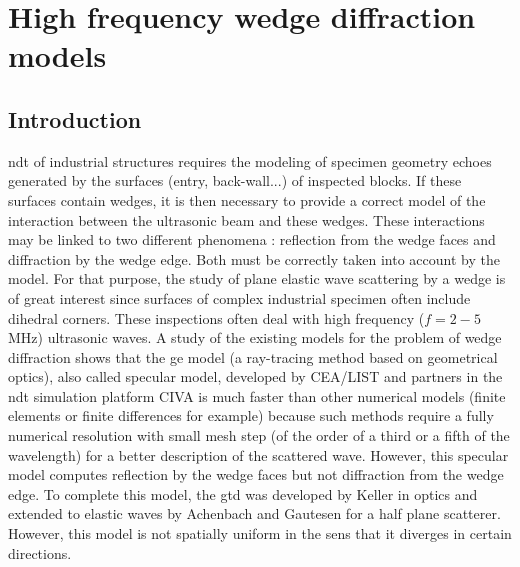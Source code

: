 \chapter[][State of the Art]{High frequency wedge diffraction models}
\label{chap-biblio}

\section*{Introduction}
\acrfull{ndt} of industrial structures requires the modeling of specimen geometry echoes generated by the surfaces (entry, back-wall...) of inspected blocks. If these surfaces contain wedges, it is then necessary to provide a correct model of the interaction between the ultrasonic beam and these wedges. These interactions may be linked to two different phenomena : reflection from the wedge faces and diffraction by the wedge edge. Both must be correctly taken into account by the model. For that purpose, the study of plane elastic wave scattering by a wedge is of great interest since surfaces of complex industrial specimen often include dihedral corners.
These inspections often deal with high frequency ($f=2-5$ MHz) ultrasonic waves. A study of the existing models for the problem of wedge diffraction shows that the \acrfull{ge} model (a ray-tracing method based on geometrical optics), also called specular model, developed by CEA/LIST and partners in the \acrshort{ndt} simulation platform CIVA \cite{Darmonspec} is much faster than other numerical models (finite elements or finite differences for example) because such methods require a fully numerical resolution with small mesh step (of the order of a third or a fifth of the wavelength) for a better description of the scattered wave. However, this specular model computes reflection by the wedge faces but not diffraction from the wedge edge. To complete this model, the \acrfull{gtd} was developed by Keller \cite{GTD} in optics and extended to elastic waves by Achenbach and Gautesen \cite{AchenbachGautesen, Achenbach} for a half plane scatterer. However, this model is not spatially uniform in the sens that it diverges in certain directions. 

